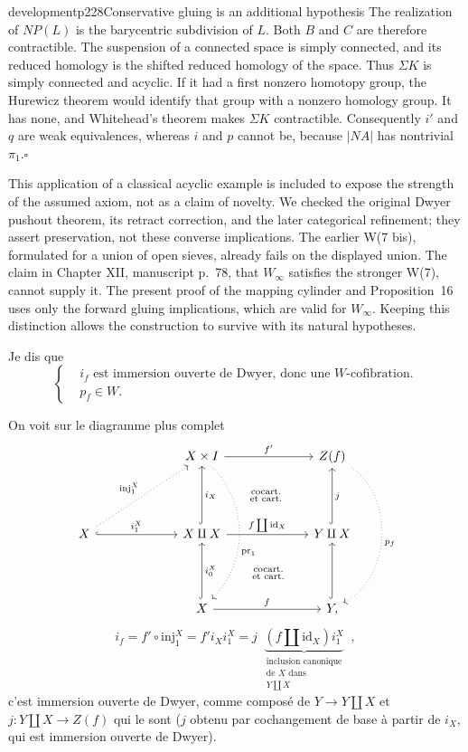 \begin{dcomment}{development}{p228}{Conservative gluing is an additional hypothesis}
The realization of $NP(L)$ is the barycentric subdivision of $L$. Both $B$ and $C$ are therefore contractible. The suspension of a connected space is simply connected, and its reduced homology is the shifted reduced homology of the space. Thus $\Sigma K$ is simply connected and acyclic. If it had a first nonzero homotopy group, the Hurewicz theorem would identify that group with a nonzero homology group. It has none, and Whitehead's theorem makes $\Sigma K$ contractible. Consequently $i'$ and $q$ are weak equivalences, whereas $i$ and $p$ cannot be, because $|NA|$ has nontrivial $\pi_1$.\hfill$\square$

This application of a classical acyclic example is included to expose the strength of the assumed axiom, not as a claim of novelty. We checked the original Dwyer pushout theorem, its retract correction, and the later categorical refinement; they assert preservation, not these converse implications. The earlier W(7 bis), formulated for a union of open sieves, already fails on the displayed union. The claim in Chapter XII, manuscript p.~78, that $W_\infty$ satisfies the stronger W(7), cannot supply it. The present proof of the mapping cylinder and Proposition~16 uses only the forward gluing implications, which are valid for $W_\infty$. Keeping this distinction allows the construction to survive with its natural hypotheses.
\end{dcomment}


Je dis que
\[
\left\{
\begin{aligned}
& i_f \text{ est immersion ouverte de Dwyer, donc une } W\text{-cofibration.} \\
& p_f \in W.
\end{aligned}
\right.
\]

On voit sur le diagramme plus complet
\[
\begin{tikzcd}[column sep=6.5em, row sep=4.5em]
& X \times I \arrow[r, "f'"] \arrow[dd, dotted, bend left=45, "\mathrm{pr}_1"{pos=.60}] \arrow[dr, phantom, "\substack{\text{cocart.}\\ \text{et cart.}}"] & Z(f) \arrow[dd, dotted, bend left=60, "p_f"] \\
X \arrow[ur, dotted, "\mathrm{inj}_1^X"] \arrow[r, hook, "i_1^X"] & X \amalg X \arrow[u, hook, "i_X"'] \arrow[r, "f \coprod \mathrm{id}_X"] \arrow[dr, phantom, "\substack{\text{cocart.}\\ \text{et cart.}}"] & Y \amalg X \arrow[u, hook, "j"'] \\
& X \arrow[u, hook, "i_0^X"'] \arrow[r, "f"] & Y, \arrow[u, hook]
\end{tikzcd}
\]
\[
i_f = f' \circ \mathrm{inj}_1^X = f' i_X i_1^X = j \ \ \underbrace{(f \amalg \mathrm{id}_X) i_1^X}_{\substack{\text{inclusion canonique}\\ \text{de } X \text{ dans}\\ Y \coprod X}} \ \ ,
\]
c'est immersion ouverte de Dwyer, comme composé de $Y \longrightarrow Y \amalg X$ et $j : Y \amalg X \longrightarrow Z(f)$ qui le sont ($j$ obtenu par cochangement de base à partir de $i_X$, qui est immersion ouverte de Dwyer).


